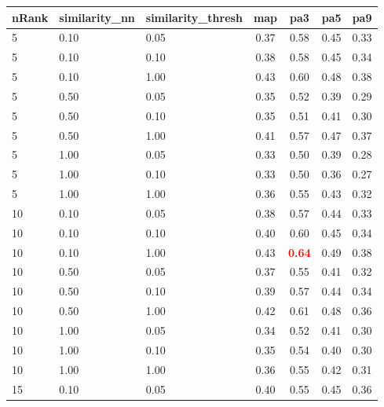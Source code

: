\documentclass[12pt,a4paper,fleqn]{tufte-handout}
\begin{document}
 
\begin{table}                         
\begin{center}                         
\scriptsize                         
\setlength{\tabcolsep}{.16667em}                         
\begin{tabular}{lllcccc}                         
nRank & similarity\_nn & similarity\_thresh & map & pa3 & pa5 & pa9 \\                         
\hline                         
5 & 0.10 & 0.05 & 0.37 & 0.58 & 0.45 & 0.33 \\                         
5 & 0.10 & 0.10 & 0.38 & 0.58 & 0.45 & 0.34 \\                         
5 & 0.10 & 1.00 & 0.43 & 0.60 & 0.48 & 0.38 \\                         
5 & 0.50 & 0.05 & 0.35 & 0.52 & 0.39 & 0.29 \\                         
5 & 0.50 & 0.10 & 0.35 & 0.51 & 0.41 & 0.30 \\                         
5 & 0.50 & 1.00 & 0.41 & 0.57 & 0.47 & 0.37 \\                         
5 & 1.00 & 0.05 & 0.33 & 0.50 & 0.39 & 0.28 \\                         
5 & 1.00 & 0.10 & 0.33 & 0.50 & 0.36 & 0.27 \\                         
5 & 1.00 & 1.00 & 0.36 & 0.55 & 0.43 & 0.32 \\                         
10 & 0.10 & 0.05 & 0.38 & 0.57 & 0.44 & 0.33 \\                         
10 & 0.10 & 0.10 & 0.40 & 0.60 & 0.45 & 0.34 \\                         
10 & 0.10 & 1.00 & 0.43 & \textbf{\textcolor{red}{0.64}} & 0.49 & 0.38 \\                         
10 & 0.50 & 0.05 & 0.37 & 0.55 & 0.41 & 0.32 \\                         
10 & 0.50 & 0.10 & 0.39 & 0.57 & 0.44 & 0.34 \\                         
10 & 0.50 & 1.00 & 0.42 & 0.61 & 0.48 & 0.36 \\                         
10 & 1.00 & 0.05 & 0.34 & 0.52 & 0.41 & 0.30 \\                         
10 & 1.00 & 0.10 & 0.35 & 0.54 & 0.40 & 0.30 \\                         
10 & 1.00 & 1.00 & 0.36 & 0.55 & 0.42 & 0.31 \\                         
15 & 0.10 & 0.05 & 0.40 & 0.55 & 0.45 & 0.36 \\                         

\end{tabular}
\end{center}
\end{table}
\end{document}
